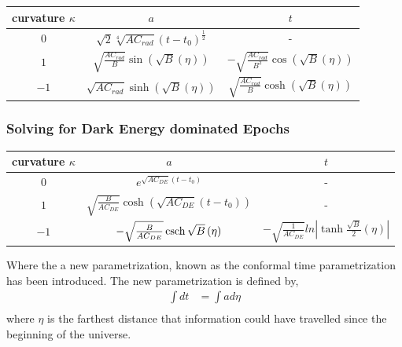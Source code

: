 \documentclass[a4paper, 11pt]{FSKH_623_Report}
\numberwithin{equation}{section}
\newcommand{\brac}[1]{\left(#1\right)}
\begin{document}
\begin{table}[H]
\centering
\begin{tabular}{| c | c | c |}
\hline\hline
curvature $\kappa$ &$a$  &$t$ \\
\hline\hline
$0$  &$\sqrt{2}\sqrt[4]{AC_{rad}}\brac{t-t_{0}}^{\frac{1}{2}}$ & - \\
\hline
$1$  &$\sqrt{\frac{AC_{rad}}{B}}\sin\brac{\sqrt{B}\brac{\eta}}$ & $-\sqrt{\frac{AC_{rad}}{B^{2}}}\cos\brac{\sqrt{B}\brac{\eta}}$ \\
\hline
$-1$  & $\sqrt{AC_{rad}}\sinh\brac{\sqrt{B}\brac{\eta}}$ & $\sqrt{\frac{AC_{rad}}{B}}\cosh\brac{\sqrt{B}\brac{\eta}}$ \\
\hline
\end{tabular}
\end{table}
\subsubsection{Solving for Dark Energy dominated Epochs}
\begin{table}[H]
\centering
\begin{tabular}{| c | c | c |}
\hline\hline
curvature $\kappa$ &$a$  &$t$ \\
\hline\hline
$0$  &$e^{\sqrt{AC_{DE}}\brac{t-t_{0}}}$ & - \\
\hline
$1$  &$\sqrt{\frac{B}{AC_{DE}}}\cosh\brac{\sqrt{AC_{DE}}\brac{t-t_{0}}}$ & - \\
\hline
$-1$  & $-\sqrt{\frac{B}{AC_{DE}}}\csch\sqrt{B}\brac{\eta}$ & $-\sqrt{\frac{1}{AC_{DE}}}ln\left|\tanh\frac{\sqrt{B}}{2}\brac{\eta}\right|$ \\
\hline
\end{tabular}
\end{table}
Where the a new parametrization, known as the conformal time parametrization has been introduced. The new parametrization is defined by, 
\begin{equation}
\begin{split}
\int dt &= \int a d\eta\\
\end{split}
\end{equation}
where $\eta$ is the farthest distance that information could have travelled since the beginning of the universe\citep{ConF}.
\end{document}
